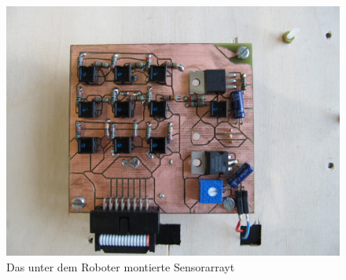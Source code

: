 \documentclass[a4paper,bibtotoc,oneside]{scrbook}
\begin{document}
\begin{figure}[htbp]
\centering
\includegraphics[width=125mm]{img/sensor_array.jpg}
\caption{Das unter dem Roboter montierte Sensorarrayt}\label{array3}
\end{figure}
\end{document}

